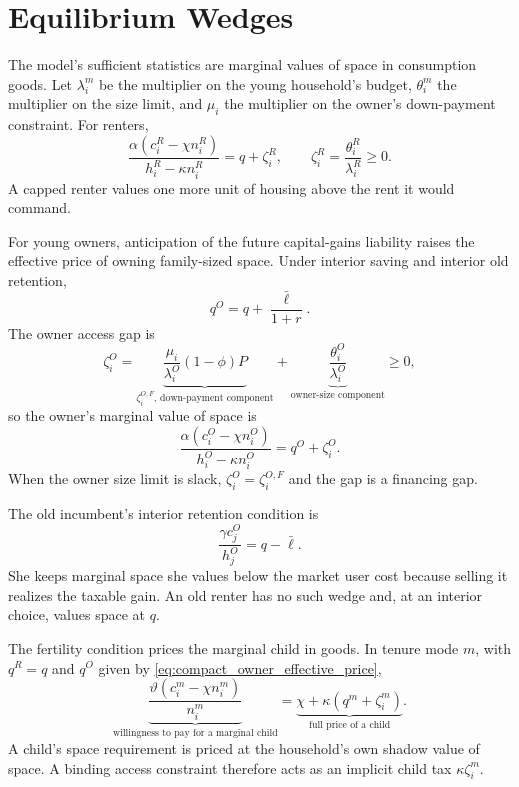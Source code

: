 \documentclass[11pt]{article}
\newcommand{\1}{\mathbf 1}
\begin{document}
\section{Equilibrium Wedges}

The model's sufficient statistics are marginal values of space in consumption
goods. Let $\lambda_i^m$ be the multiplier on the young household's budget,
$\theta_i^m$ the multiplier on the size limit, and $\mu_i$ the multiplier on
the owner's down-payment constraint. For renters,
\begin{equation}
\frac{\alpha(c_i^R-\chi n_i^R)}{h_i^R-\kappa n_i^R}
=
q+\zeta_i^R,
\qquad
\zeta_i^R=\frac{\theta_i^R}{\lambda_i^R}\ge0.
\label{eq:compact_renter_mv}
\end{equation}
A capped renter values one more unit of housing above the rent it would command.

For young owners, anticipation of the future capital-gains liability raises the
effective price of owning family-sized space. Under interior saving and
interior old retention,
\begin{equation}
q^O=q+\frac{\bar\ell}{1+r}.
\label{eq:compact_owner_effective_price}
\end{equation}
The owner access gap is
\begin{equation}
\zeta_i^O
=
\underbrace{\frac{\mu_i}{\lambda_i^O}(1-\phi)P}_{\zeta_i^{O,F}\text{, down-payment component}}
+
\underbrace{\frac{\theta_i^O}{\lambda_i^O}}_{\text{owner-size component}}
\ge0,
\label{eq:compact_owner_zeta}
\end{equation}
so the owner's marginal value of space is
\begin{equation}
\frac{\alpha(c_i^O-\chi n_i^O)}{h_i^O-\kappa n_i^O}
=
q^O+\zeta_i^O.
\label{eq:compact_owner_mv}
\end{equation}
When the owner size limit is slack, $\zeta_i^O=\zeta_i^{O,F}$ and the gap is a
financing gap.

The old incumbent's interior retention condition is
\begin{equation}
\frac{\gamma c_j^O}{h_j^O}=q-\bar\ell.
\label{eq:compact_old_mv}
\end{equation}
She keeps marginal space she values below the market user cost because selling
it realizes the taxable gain. An old renter has no such wedge and, at an
interior choice, values space at $q$.

The fertility condition prices the marginal child in goods. In tenure mode
$m$, with $q^R=q$ and $q^O$ given by
\eqref{eq:compact_owner_effective_price},
\begin{equation}
\underbrace{\frac{\vartheta(c_i^m-\chi n_i^m)}{n_i^m}}_{\text{willingness to pay for a marginal child}}
=
\underbrace{\chi+\kappa(q^m+\zeta_i^m)}_{\text{full price of a child}}.
\label{eq:compact_child_price}
\end{equation}
A child's space requirement is priced at the household's own shadow value of
space. A binding access constraint therefore acts as an implicit child tax
$\kappa\zeta_i^m$.
\end{document}
